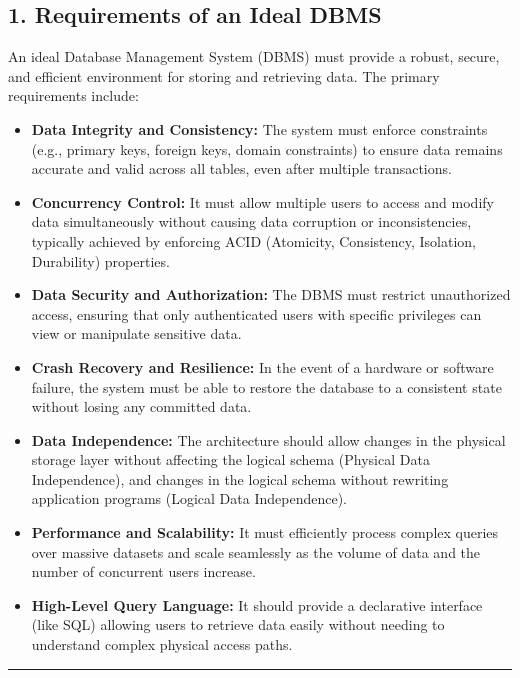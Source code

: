 \documentclass[12pt,a3paper]{article}
\begin{document}
\begin{enumerate}
\begin{tcolorbox}[enhanced,breakable,ansbox,colback=cA!4,colframe=cA,boxrule=0.8pt,arc=5pt,title={\textbf{Answer}},fonttitle=\bfseries\color{white},colbacktitle=cA]
\subsection*{1. Requirements of an Ideal DBMS}

An ideal Database Management System (DBMS) must provide a robust, secure, and efficient environment for storing and retrieving data. The primary requirements include:

\begin{itemize}
    \item \textbf{Data Integrity and Consistency:} The system must enforce constraints (e.g., primary keys, foreign keys, domain constraints) to ensure data remains accurate and valid across all tables, even after multiple transactions.
    \item \textbf{Concurrency Control:} It must allow multiple users to access and modify data simultaneously without causing data corruption or inconsistencies, typically achieved by enforcing ACID (Atomicity, Consistency, Isolation, Durability) properties.
    \item \textbf{Data Security and Authorization:} The DBMS must restrict unauthorized access, ensuring that only authenticated users with specific privileges can view or manipulate sensitive data.
    \item \textbf{Crash Recovery and Resilience:} In the event of a hardware or software failure, the system must be able to restore the database to a consistent state without losing any committed data.
    \item \textbf{Data Independence:} The architecture should allow changes in the physical storage layer without affecting the logical schema (Physical Data Independence), and changes in the logical schema without rewriting application programs (Logical Data Independence).
    \item \textbf{Performance and Scalability:} It must efficiently process complex queries over massive datasets and scale seamlessly as the volume of data and the number of concurrent users increase.
    \item \textbf{High-Level Query Language:} It should provide a declarative interface (like SQL) allowing users to retrieve data easily without needing to understand complex physical access paths.
\end{itemize}

\vspace{1em}
\hrule
\vspace{1em}


\end{tcolorbox}
\end{enumerate}
\end{document}
